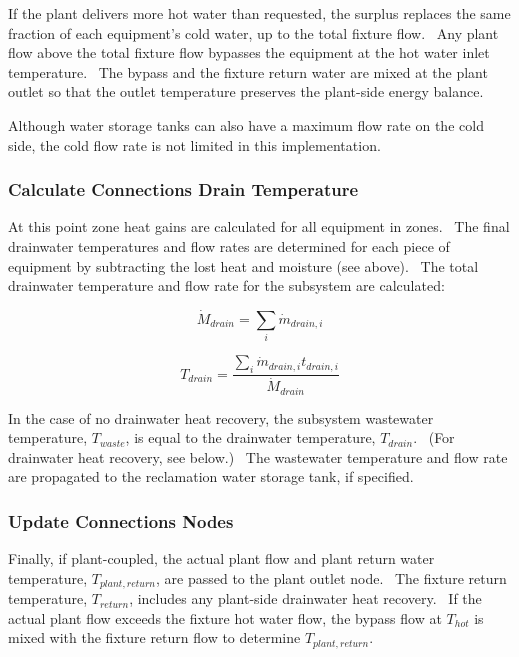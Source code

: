 If the plant delivers more hot water than requested, the surplus replaces the same fraction of each equipment's cold water, up to the total fixture flow.~ Any plant flow above the total fixture flow bypasses the equipment at the hot water inlet temperature.~ The bypass and the fixture return water are mixed at the plant outlet so that the outlet temperature preserves the plant-side energy balance.

Although water storage tanks can also have a maximum flow rate on the cold side, the cold flow rate is not limited in this implementation.

\subsubsection{Calculate Connections Drain Temperature}\label{calculate-connections-drain-temperature}

At this point zone heat gains are calculated for all equipment in zones.~ The final drainwater temperatures and flow rates are determined for each piece of equipment by subtracting the lost heat and moisture (see above).~ The total drainwater temperature and flow rate for the subsystem are calculated:

\begin{equation}
{\dot M_{drain}} = \mathop \sum \limits_i {\dot m_{drain,i}}
\end{equation}

\begin{equation}
{T_{drain}} = \frac{{\mathop \sum \limits_i {{\dot m}_{drain,i}}{t_{drain,i}}}}{{{{\dot M}_{drain}}}}
\end{equation}

In the case of no drainwater heat recovery, the subsystem wastewater temperature, \({T_{waste}}\), is equal to the drainwater temperature, \({T_{drain}}\).~ (For drainwater heat recovery, see below.)~ The wastewater temperature and flow rate are propagated to the reclamation water storage tank, if specified.

\subsubsection{Update Connections Nodes}\label{update-connections-nodes}

Finally, if plant-coupled, the actual plant flow and plant return water temperature, \({T_{plant,return}}\), are passed to the plant outlet node.~ The fixture return temperature, \({T_{return}}\), includes any plant-side drainwater heat recovery.~ If the actual plant flow exceeds the fixture hot water flow, the bypass flow at \({T_{hot}}\) is mixed with the fixture return flow to determine \({T_{plant,return}}\).

